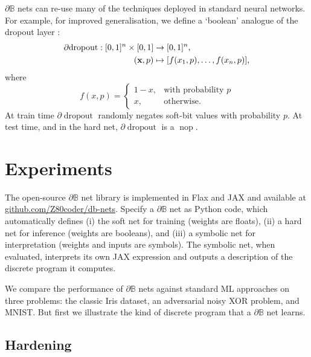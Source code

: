 \documentclass{article} %
\begin{document}
$\partial\mathbb{B}$ nets can re-use many of the techniques deployed in standard neural networks. For example, for improved generalisation, we define a `boolean' analogue of the dropout layer \citep{JMLR:v15:srivastava14a}:
\begin{equation*}
\begin{aligned}
\partial\!\operatorname{dropout}: [0,1]^{n} \times [0,1] &\to [0,1]^{n}, \\
({\bf x}, p) &\mapsto [f(x_{1}, p), \dots, f(x_{n}, p)]\text{,}
\end{aligned}
\end{equation*}
where
\begin{equation*}
f(x, p) = \begin{cases}
1 - x, & \text{with probability } p \\
x, & \text{otherwise.}
\end{cases}
\end{equation*}
At train time $\partial\!\operatorname{dropout}$ randomly negates soft-bit values with probability $p$. At test time, and in the hard net, $\partial\!\operatorname{dropout}$ is a $\operatorname{nop}$.

\section{Experiments}\label{sec:experiments}

The open-source $\partial\mathbb{B}$ net library is implemented in Flax \citep{flax2020github} and JAX \citep{jax2018github} and available at {\small \url{github.com/Z80coder/db-nets}}. Specify a $\partial\mathbb{B}$ net as Python code, which automatically defines (i) the soft net for training (weights are floats), (ii) a hard net for inference (weights are booleans), and (iii) a symbolic net for interpretation (weights and inputs are symbols). The symbolic net, when evaluated, interprets its own JAX expression and outputs a description of the discrete program it computes.

We compare the performance of $\partial\mathbb{B}$ nets against standard ML approaches on three problems: the classic Iris dataset, an adversarial noisy XOR problem, and MNIST. But first we illustrate the kind of discrete program that a $\partial\mathbb{B}$ net learns.

\subsection{Hardening}
\end{document}
